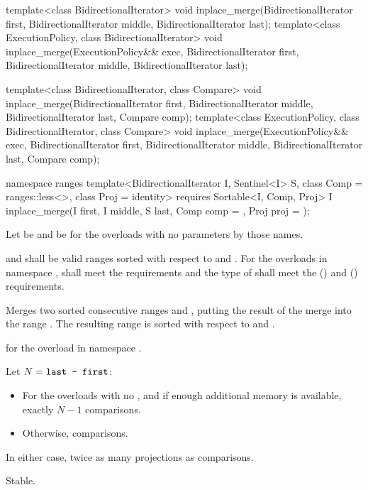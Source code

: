 %
\begin{itemdecl}
template<class BidirectionalIterator>
  void inplace_merge(BidirectionalIterator first,
                     BidirectionalIterator middle,
                     BidirectionalIterator last);
template<class ExecutionPolicy, class BidirectionalIterator>
  void inplace_merge(ExecutionPolicy&& exec,
                     BidirectionalIterator first,
                     BidirectionalIterator middle,
                     BidirectionalIterator last);

template<class BidirectionalIterator, class Compare>
  void inplace_merge(BidirectionalIterator first,
                     BidirectionalIterator middle,
                     BidirectionalIterator last, Compare comp);
template<class ExecutionPolicy, class BidirectionalIterator, class Compare>
  void inplace_merge(ExecutionPolicy&& exec,
                     BidirectionalIterator first,
                     BidirectionalIterator middle,
                     BidirectionalIterator last, Compare comp);

namespace ranges {
  template<BidirectionalIterator I, Sentinel<I> S, class Comp = ranges::less<>,
      class Proj = identity>
    requires Sortable<I, Comp, Proj>
    I inplace_merge(I first, I middle, S last, Comp comp = {}, Proj proj = {});
}
\end{itemdecl}

\begin{itemdescr}
\pnum
Let  be 
and  be 
for the overloads with no parameters by those names.

\pnum
\requires
{} and  shall be valid ranges
sorted with respect to  and .
For the overloads in namespace ,
 shall meet the
 requirements and
the type of  shall meet the
 () and
 () requirements.

\pnum
\effects
Merges two sorted consecutive ranges
and
,
putting the result of the merge into the range
.
The resulting range is sorted with respect to  and .

\pnum
\returns
{} for the overload in namespace .

\pnum
\complexity Let $N = \texttt{last - first}$:
\begin{itemize}
\item For the overloads with no , and if enough additional
memory is available, exactly $N - 1$ comparisons.
\item Otherwise,  comparisons.
\end{itemize}
In either case, twice as many projections as comparisons.

\pnum
\remarks Stable.
\end{itemdescr}

